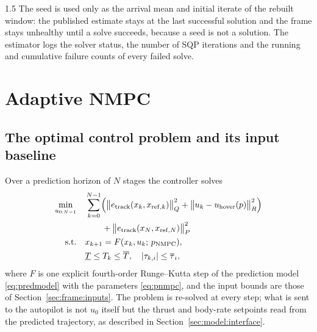 \begin{spacing}{1.5}
The seed is used only as the arrival mean and initial iterate of the rebuilt
window: the published estimate stays at the last successful solution and the
frame stays unhealthy until a solve succeeds, because a seed is not a solution.
The estimator logs the solver
status, the number of SQP iterations and the running and cumulative failure
counts of every failed solve.

\section{Adaptive NMPC}\label{sec:frame:nmpc}

\subsection{The optimal control problem and its input baseline}\label{sec:model:hover}

Over a prediction horizon of $N$ stages the controller solves
\begin{align}
\min_{u_{0:N-1}} \quad
& \sum_{k=0}^{N-1} \Bigl( \bigl\| e_{\mathrm{track}}(x_k, x_{\mathrm{ref},k}) \bigr\|^2_{Q}
+ \bigl\| u_k - u_{\mathrm{hover}}(p) \bigr\|^2_{R} \Bigr) \nonumber \\
& \qquad + \bigl\| e_{\mathrm{track}}(x_N, x_{\mathrm{ref},N}) \bigr\|^2_{P} \nonumber \\
\mathrm{s.t.} \quad
& x_{k+1} = F(x_k, u_k;\, p_{\mathrm{NMPC}}), \nonumber \\
& \underline{T} \le T_k \le \overline{T}, \quad
  |\tau_{k,i}| \le \overline{\tau}_i ,
\label{eq:nmpc}
\end{align}
where $F$ is one explicit fourth-order Runge--Kutta step of the prediction model
\eqref{eq:predmodel} with the parameters \eqref{eq:pnmpc}, and the input bounds
are those of Section~\ref{sec:frame:inputs}. The problem is re-solved at every
step; what is sent to the autopilot is not $u_0$ itself but the thrust and
body-rate setpoints read from the predicted trajectory, as described in
Section~\ref{sec:model:interface}.


\end{spacing}
